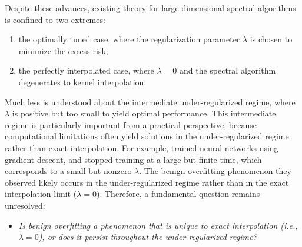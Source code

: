 \documentclass{article}
\theoremstyle{plain}
\theoremstyle{definition}
\theoremstyle{remark}
\begin{document}
Despite these advances, existing theory for large-dimensional spectral algorithms is confined to two extremes: 
\begin{enumerate}
    \item the optimally tuned case, where the regularization parameter $\lambda$ is chosen to minimize the excess risk; 
    \item the perfectly interpolated case, where $\lambda=0$ and the spectral algorithm degenerates to kernel interpolation.
\end{enumerate}
Much less is understood about the intermediate { under-regularized} regime, where $\lambda$ is positive but too small to yield optimal performance. 
This intermediate regime is particularly important from a practical perspective, because computational limitations often yield solutions in the { under-regularized} regime rather than exact interpolation. 
For example, \cite{zhang2016understanding} trained neural networks using gradient descent, and stopped training at a large but finite time, which corresponds to a small but nonzero $\lambda$. 
The benign overfitting phenomenon they observed likely occurs in the { under-regularized} regime rather than in the exact interpolation limit ($\lambda=0$).
Therefore, a fundamental question remains unresolved: 
\begin{itemize}
    \item []
   \textit{ Is benign overfitting a phenomenon that is unique to exact interpolation (i.e., $\lambda=0$), or does it persist throughout the { under-regularized} regime? }
\end{itemize}



\end{document}
